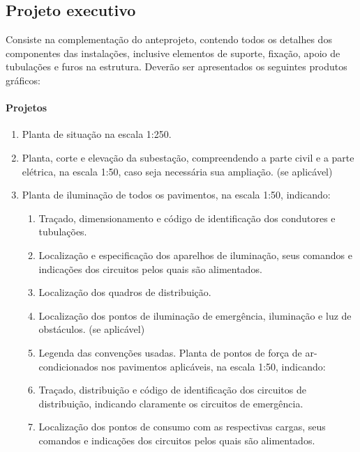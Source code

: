 \subsection{Projeto executivo} \label{subsection: etapa-PE}

Consiste na complementação do anteprojeto, contendo todos os detalhes dos componentes das instalações, inclusive elementos de suporte, fixação, apoio de tubulações e furos na estrutura. Deverão ser apresentados os seguintes produtos gráficos:

\paragraph{Projetos}
	\begin{enumerate}

		\item Planta de situação na escala 1:250.

		\item Planta, corte e elevação da subestação, compreendendo a parte civil e a parte elétrica, na escala 1:50, caso seja necessária sua ampliação. (se aplicável)

		\item Planta de iluminação de todos os pavimentos, na escala 1:50, indicando:
			\begin{enumerate}
				\item Traçado, dimensionamento e código de identificação dos condutores e tubulações.

				\item Localização e especificação dos aparelhos de iluminação, seus comandos e indicações dos circuitos pelos quais são alimentados.

				\item Localização dos quadros de distribuição.

				\item Localização dos pontos de iluminação de emergência, iluminação e luz de obstáculos. (se aplicável)

				\item Legenda das convenções usadas.
				Planta de pontos de força de ar-condicionados nos pavimentos aplicáveis, na escala 1:50, indicando:

				\item Traçado, distribuição e código de identificação dos circuitos de distribuição, indicando claramente os circuitos de emergência.

				\item Localização dos pontos de consumo com as respectivas cargas, seus comandos e indicações dos circuitos pelos quais são alimentados.


\end{enumerate}
\end{enumerate}
